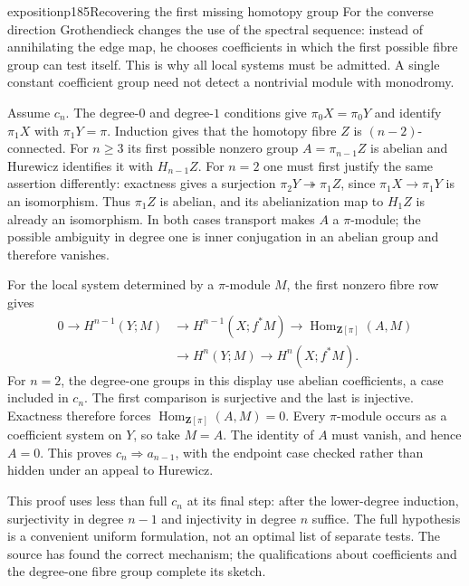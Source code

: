 \begin{dcomment}{exposition}{p185}{Recovering the first missing homotopy group}
For the converse direction Grothendieck changes the use of the spectral sequence: instead of annihilating the edge map, he chooses coefficients in which the first possible fibre group can test itself. This is why all local systems must be admitted. A single constant coefficient group need not detect a nontrivial module with monodromy.

Assume $c_n$. The degree-$0$ and degree-$1$ conditions give $\pi_0X=\pi_0Y$ and identify $\pi_1X$ with $\pi_1Y=\pi$. Induction gives that the homotopy fibre $Z$ is $(n-2)$-connected. For $n\geq3$ its first possible nonzero group $A=\pi_{n-1}Z$ is abelian and Hurewicz identifies it with $H_{n-1}Z$. For $n=2$ one must first justify the same assertion differently: exactness gives a surjection $\pi_2Y\twoheadrightarrow\pi_1Z$, since $\pi_1X\to\pi_1Y$ is an isomorphism. Thus $\pi_1Z$ is abelian, and its abelianization map to $H_1Z$ is already an isomorphism. In both cases transport makes $A$ a $\pi$-module; the possible ambiguity in degree one is inner conjugation in an abelian group and therefore vanishes.

For the local system determined by a $\pi$-module $M$, the first nonzero fibre row gives
\[
\begin{split}
0\longrightarrow H^{n-1}(Y;M)&\longrightarrow H^{n-1}(X;f^*M)
 \longrightarrow\operatorname{Hom}_{\mathbf Z[\pi]}(A,M)\\
 &\longrightarrow H^n(Y;M)\longrightarrow H^n(X;f^*M).
\end{split}
\]
For $n=2$, the degree-one groups in this display use abelian coefficients, a case included in $c_n$. The first comparison is surjective and the last is injective. Exactness therefore forces $\operatorname{Hom}_{\mathbf Z[\pi]}(A,M)=0$. Every $\pi$-module occurs as a coefficient system on $Y$, so take $M=A$. The identity of $A$ must vanish, and hence $A=0$. This proves $c_n\Rightarrow a_{n-1}$, with the endpoint case checked rather than hidden under an appeal to Hurewicz.

This proof uses less than full $c_n$ at its final step: after the lower-degree induction, surjectivity in degree $n-1$ and injectivity in degree $n$ suffice. The full hypothesis is a convenient uniform formulation, not an optimal list of separate tests. The source has found the correct mechanism; the qualifications about coefficients and the degree-one fibre group complete its sketch.
\end{dcomment}

